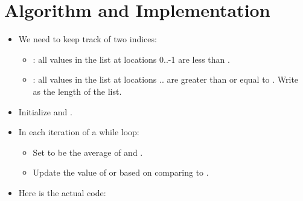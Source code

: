 \documentclass[letterpaper,10pt,english]{sphinxmanual}
\begin{document}
\section{Algorithm and Implementation}
\label{\detokenize{lecture_notes/lec20_searching:algorithm-and-implementation}}\begin{itemize}
\item {} 
We need to keep track of two indices:
\begin{itemize}
\item {} 
: all values in the list at locations 0..-1 are
less than .

\item {} 
: all values in the list at locations  ..
are greater than or equal to . Write  as the length of
the list.

\end{itemize}

\item {} 
Initialize  and .

\item {} 
In each iteration of a while loop:
\begin{itemize}
\item {} 
Set  to be the average of  and .

\item {} 
Update the value of  or  based on comparing 
to .

\end{itemize}

\item {} 
Here is the actual code:

\begin{sphinxVerbatim}[commandchars=\\\{\}]
  
      
      
       
              
           \PYG{p}{[}\PYG{p}{]}
                
              
     
\end{sphinxVerbatim}

\end{itemize}
\end{document}
